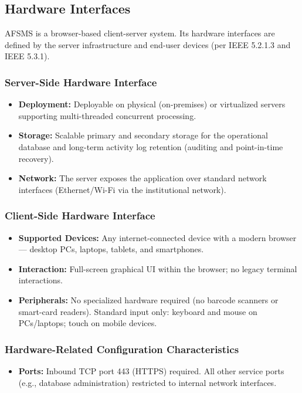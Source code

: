 \documentclass[11pt, a4paper]{article}
\begin{document}
\subsection{Hardware Interfaces}
AFSMS is a browser-based client-server system. Its hardware interfaces are defined by the server infrastructure and end-user devices (per IEEE 5.2.1.3 and IEEE 5.3.1).

\subsubsection{Server-Side Hardware Interface}
\begin{itemize}
    \item \textbf{Deployment:} Deployable on physical (on-premises) or virtualized servers supporting multi-threaded concurrent processing.
    \item \textbf{Storage:} Scalable primary and secondary storage for the operational database and long-term activity log retention (auditing and point-in-time recovery).
    \item \textbf{Network:} The server exposes the application over standard network interfaces (Ethernet/Wi-Fi via the institutional network).
\end{itemize}

\subsubsection{Client-Side Hardware Interface}
\begin{itemize}
    \item \textbf{Supported Devices:} Any internet-connected device with a modern browser --- desktop PCs, laptops, tablets, and smartphones.
    \item \textbf{Interaction:} Full-screen graphical UI within the browser; no legacy terminal interactions.
    \item \textbf{Peripherals:} No specialized hardware required (no barcode scanners or smart-card readers). Standard input only: keyboard and mouse on PCs/laptops; touch on mobile devices.
\end{itemize}

\subsubsection{Hardware-Related Configuration Characteristics}
\begin{itemize}
    \item \textbf{Ports:} Inbound TCP port 443 (HTTPS) required. All other service ports (e.g., database administration) restricted to internal network interfaces.
\end{itemize}
\end{document}
